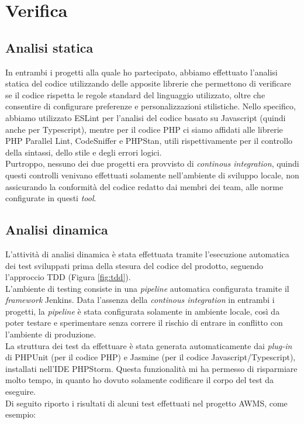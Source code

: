 \section{Verifica}
\subsection{Analisi statica}
In entrambi i progetti alla quale ho partecipato, abbiamo effettuato l'analisi statica del codice utilizzando delle apposite librerie che permettono di verificare se il codice rispetta le regole standard del linguaggio utilizzato, oltre che consentire di configurare preferenze e personalizzazioni stilistiche.
Nello specifico, abbiamo utilizzato ESLint per l'analisi del codice basato su Javascript (quindi anche per Typescript), mentre per il codice PHP ci siamo affidati alle librerie PHP Parallel Lint, CodeSniffer e PHPStan, utili rispettivamente per il controllo della sintassi, dello stile e degli errori logici.\\
Purtroppo, nessuno dei due progetti era provvisto di \textit{continous integration}, quindi questi controlli venivano effettuati solamente nell'ambiente di sviluppo locale, non assicurando la conformità del codice redatto dai membri dei team, alle norme configurate in questi \textit{tool}.
\subsection{Analisi dinamica}
L'attività di analisi dinamica è stata effettuata tramite l'esecuzione automatica dei test sviluppati prima della stesura del codice del prodotto, seguendo l'approccio TDD (Figura \ref{fig:tdd}).\\
L'ambiente di testing consiste in una \textit{pipeline} automatica configurata tramite il \textit{framework} Jenkins. Data l'assenza della \textit{continous integration} in entrambi i progetti, la \textit{pipeline} è stata configurata solamente in ambiente locale, così da poter testare e sperimentare senza correre il rischio di entrare in conflitto con l'ambiente di produzione.\\
La struttura dei test da effettuare è stata generata automaticamente dai \textit{plug-in} di PHPUnit (per il codice PHP) e Jasmine (per il codice Javascript/Typescript), installati nell'IDE PHPStorm. Questa funzionalità mi ha permesso di risparmiare molto tempo, in quanto ho dovuto solamente codificare il corpo del test da eseguire.\\
Di seguito riporto i risultati di alcuni test effettuati nel progetto AWMS, come esempio:

